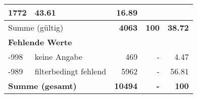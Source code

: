 \begin{longtable}{lXrrr}
       \num{1772} &
       \num[round-mode=places,round-precision=2]{43.61} &
         \num[round-mode=places,round-precision=2]{16.89} \\
     \midrule
     \multicolumn{2}{l}{Summe (gültig)} &
       \textbf{\num{4063}} &
     \textbf{\num{100}} &
       \textbf{\num[round-mode=places,round-precision=2]{38.72}} \\
     \multicolumn{5}{l}{\textbf{Fehlende Werte}}\\
       -998 &
       keine Angabe &
         \num{469} &
        - &
         \num[round-mode=places,round-precision=2]{4.47} \\
       -989 &
       filterbedingt fehlend &
         \num{5962} &
        - &
         \num[round-mode=places,round-precision=2]{56.81} \\
     \midrule
     \multicolumn{2}{l}{\textbf{Summe (gesamt)}} &
          \textbf{\num{10494}} &
        \textbf{-} &
        \textbf{\num{100}} \\
     \bottomrule
     \end{longtable}
     
